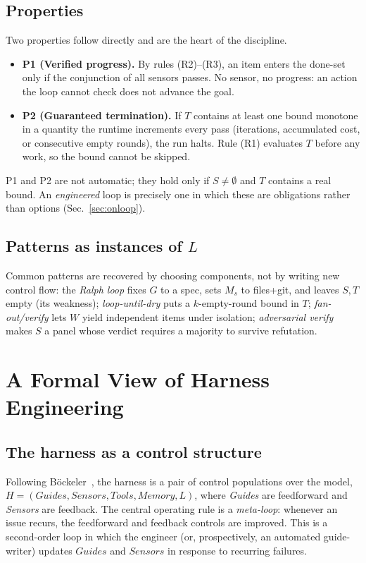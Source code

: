 \documentclass[10pt,twocolumn,letterpaper]{article}
\begin{document}
\subsection{Properties}
Two properties follow directly and are the heart of the discipline.
\begin{itemize}[leftmargin=1.2em,itemsep=2pt,topsep=2pt]
\item \textbf{P1 (Verified progress).} By rules (R2)--(R3), an item enters the
done-set only if the conjunction of all sensors passes. No sensor, no progress:
an action the loop cannot check does not advance the goal.
\item \textbf{P2 (Guaranteed termination).} If $T$ contains at least one bound
monotone in a quantity the runtime increments every pass (iterations,
accumulated cost, or consecutive empty rounds), the run halts. Rule (R1)
evaluates $T$ before any work, so the bound cannot be skipped.
\end{itemize}
P1 and P2 are not automatic; they hold only if $S \neq \emptyset$ and $T$
contains a real bound. An \emph{engineered} loop is precisely one in which these
are obligations rather than options (Sec.~\ref{sec:onloop}).

\subsection{Patterns as instances of \texorpdfstring{$L$}{L}}
Common patterns are recovered by choosing components, not by writing new control
flow: the \emph{Ralph loop} fixes $G$ to a spec, sets $M_s$ to files+git, and
leaves $S,T$ empty (its weakness); \emph{loop-until-dry} puts a $k$-empty-round
bound in $T$; \emph{fan-out/verify} lets $W$ yield independent items under
isolation; \emph{adversarial verify} makes $S$ a panel whose verdict requires a
majority to survive refutation.

\section{A Formal View of Harness Engineering}
\label{sec:harness}

\subsection{The harness as a control structure}
Following B\"ockeler~\cite{bockeler}, the harness is a pair of control
populations over the model, $H = (\mathit{Guides}, \mathit{Sensors},
\mathit{Tools}, \mathit{Memory}, L)$, where \emph{Guides} are feedforward and
\emph{Sensors} are feedback. The central operating rule is a \emph{meta-loop}:
whenever an issue recurs, the feedforward and feedback controls are improved.
This is a second-order loop in which the engineer (or, prospectively, an
automated guide-writer) updates $\mathit{Guides}$ and $\mathit{Sensors}$ in
response to recurring failures.
\end{document}
